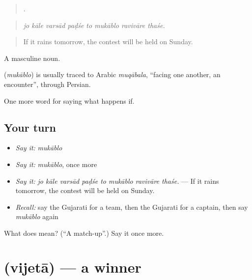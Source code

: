 \begin{quote}
       .
\end{quote}

\begin{quote}
\emph{jo kāle varsād paḍśe to mukāblo ravivāre thaśe.}
\end{quote}

\begin{quote}
If it rains tomorrow, the contest will be held on Sunday.
\end{quote}

A masculine noun.

\begin{cousinweb}
\textbf{} (\emph{mukāblo}) is usually traced to Arabic \emph{muqābala}, \textquotedblleft{}facing one another, an encounter\textquotedblright{}, through Persian.
\end{cousinweb}

\begin{grammarlens}[title={What you've built}]
One more word for saying what happens if.
\end{grammarlens}

\subsection*{Your turn}
\begin{itemize}
\raggedright
  \item \emph{Say it:} \emph{mukāblo}
  \item \emph{Say it:} \emph{mukāblo}, once more
  \item \emph{Say it:} \emph{jo kāle varsād paḍśe to mukāblo ravivāre thaśe.} — If it rains tomorrow, the contest will be held on Sunday.
  \item \emph{Recall:} say the Gujarati for a team, then the Gujarati for a captain, then say \emph{mukāblo} again
\end{itemize}

\begin{tcolorbox}[breakable,colback=teal!4,colframe=teal!35!black,title={Before you move on}]
What does  mean? (\textquotedblleft{}A match-up\textquotedblright{}.) Say it once more.
\end{tcolorbox}
\section[\texorpdfstring{\gu{વિજેતા} (vijetā)}{વિજેતા (vijetā)}]{ (vijetā) — a winner}

